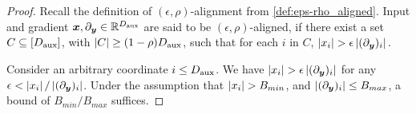 \examplealignment*
\begin{proof}
    Recall the definition of $(\epsilon, \rho)$-alignment from \cref{def:eps-rho_aligned}. Input and gradient ${\bm{x}}, \partial_{{\bm{y}}} \in \mathbb{R}^{D_{\text{aux}}}$ are said to be $(\epsilon, \rho)$-aligned, if there exist a set $C \subseteq [D_{\text{aux}}]$, with  $\left| C \right| \ge (1 - \rho) D_{\text{aux}}$, such that for each $i$ in $C$, $\left| x_i \right| > \epsilon \left|  (\partial_{{\bm{y}}} )_i  \right|.$ 

    Consider an arbitrary coordinate $i \le D_{\text{aux}}$. We have $\left| x_i \right| > \epsilon  \left| (\partial_{{\bm{y}}})_i \right|$ for any $\epsilon < \left| x_i \right| / \left| (\partial_{{\bm{y}}})_i \right|$. Under the assumption that $\left| x_i \right| > B_{min}$, and $\left| (\partial_{{\bm{y}}})_i \right| \le B_{max}$, a bound of $B_{min} / B_{max}$ suffices. 
\end{proof}

